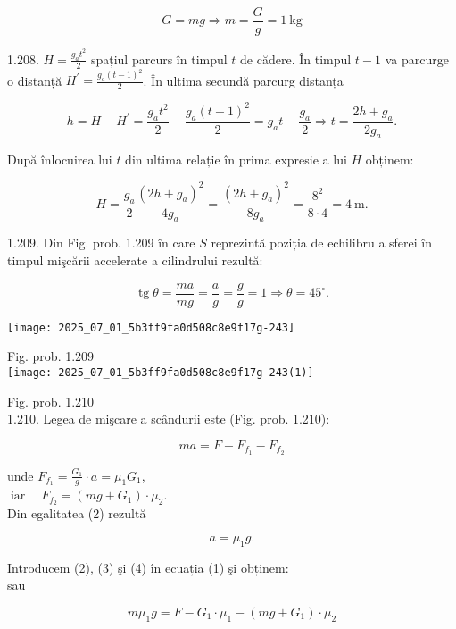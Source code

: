 $$
G=m g \Rightarrow m=\frac{G}{g}=1 \mathrm{~kg}
$$

1.208. $H=\frac{g_{a} t^{2}}{2}$ spațiul parcurs în timpul $t$ de cădere. În timpul $t-1$ va parcurge o distanță $H^{\prime}=\frac{g_{a}(t-1)^{2}}{2}$. În ultima secundă parcurg distanța

$$
h=H-H^{\prime}=\frac{g_{a} t^{2}}{2}-\frac{g_{a}(t-1)^{2}}{2}=g_{a} t-\frac{g_{a}}{2} \Rightarrow t=\frac{2 h+g_{a}}{2 g_{a}} .
$$

După înlocuirea lui $t$ din ultima relație în prima expresie a lui $H$ obținem:

$$
H=\frac{g_{a}}{2} \frac{\left(2 h+g_{a}\right)^{2}}{4 g_{a}}=\frac{\left(2 h+g_{a}\right)^{2}}{8 g_{a}}=\frac{8^{2}}{8 \cdot 4}=4 \mathrm{~m} .
$$

1.209. Din Fig. prob. 1.209 în care $S$ reprezintă poziția de echilibru a sferei în timpul mişcării accelerate a cilindrului rezultă:

$$
\operatorname{tg} \theta=\frac{m a}{m g}=\frac{a}{g}=\frac{g}{g}=1 \Rightarrow \theta=45^{\circ} .
$$

\begin{center}
\texttt{[image: 2025\_07\_01\_5b3ff9fa0d508c8e9f17g-243]}
\end{center}

Fig. prob. 1.209\\
\texttt{[image: 2025\_07\_01\_5b3ff9fa0d508c8e9f17g-243(1)]}

Fig. prob. 1.210\\
1.210. Legea de mişcare a scândurii este (Fig. prob. 1.210):


\begin{equation*}
m a=F-F_{f_{1}}-F_{f_{2}} \tag{1}
\end{equation*}


unde $F_{f_{1}}=\frac{G_{1}}{g} \cdot a=\mu_{1} G_{1}$,\\
$\operatorname{iar} \quad F_{f_{2}}=\left(m g+G_{1}\right) \cdot \mu_{2}$.\\
Din egalitatea (2) rezultă


\begin{equation*}
a=\mu_{1} g . \tag{4}
\end{equation*}


Introducem (2), (3) şi (4) în ecuația (1) şi obținem:\\
sau

$$
m \mu_{1} g=F-G_{1} \cdot \mu_{1}-\left(m g+G_{1}\right) \cdot \mu_{2}
$$


